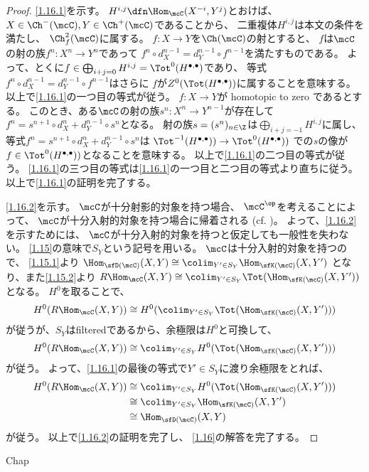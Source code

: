 \documentclass[uplatex,dvipdfmx]{jsarticle}
\begin{document}
\begin{proof}
  \ref{1.16.1}を示す。
  \(H^{i,j} \dfn \Hom_{\mcC}(X^{-i},Y^j)\)とおけば、
  \(X\in \Ch^-(\mcC), Y\in \Ch^+(\mcC)\)であることから、
  二重複体\(H^{i,j}\)は本文の条件\cite[(1.9.2)]{kashiwara2002sheaves}を満たし、
  \(\Ch^2_f(\mcC)\)に属する。
  \(f:X\to Y\)を\(\Ch(\mcC)\)の射とすると、
  \(f\)は\(\mcC\)の射の族\(f^n:X^n\to Y^n\)であって
  \(f^n\circ d_X^{n-1} = d_Y^{n-1}\circ f^{n-1}\)を満たすものである。
  よって、とくに\(f\in \bigoplus_{i+j = 0} H^{i,j} = \Tot^0(H^{\bullet,\bullet})\)であり、
  等式\(f^n\circ d_X^{n-1} = d_Y^{n-1}\circ f^{n-1}\)はさらに
  \(f\)が\(Z^0(\Tot(H^{\bullet,\bullet}))\)に属することを意味する。
  以上で\ref{1.16.1}の一つ目の等式が従う。
  \(f:X\to Y\)が homotopic to zero であるとする。
  このとき、ある\(\mcC\)の射の族\(s^n:X^n\to Y^{n-1}\)が存在して
  \(f^n = s^{n+1}\circ d_X^n + d_Y^{n-1} \circ s^n\)となる。
  射の族\(s=(s^n)_{n\in \Z}\)は\(\bigoplus_{i+j=-1}H^{i,j}\)に属し、
  等式\(f^n = s^{n+1}\circ d_X^n + d_Y^{n-1} \circ s^n\)は
  \(\Tot^{-1}(H^{\bullet,\bullet}))\to \Tot^0(H^{\bullet,\bullet}))\)
  での\(s\)の像が\(f\in \Tot^0(H^{\bullet,\bullet}))\)となることを意味する。
  以上で\ref{1.16.1}の二つ目の等式が従う。
  \ref{1.16.1}の三つ目の等式は\ref{1.16.1}の一つ目と二つ目の等式より直ちに従う。
  以上で\ref{1.16.1}の証明を完了する。

  \ref{1.16.2}を示す。
  \(\mcC\)が十分射影的対象を持つ場合、
  \(\mcC^{\op}\)を考えることによって、
  \(\mcC\)が十分入射的対象を持つ場合に帰着される
  (cf. \cite[Remark 1.10.10]{kashiwara2002sheaves})。
  よって、\ref{1.16.2}を示すためには、
  \(\mcC\)が十分入射的対象を持つと仮定しても一般性を失わない。
  \autoref{1.15}の意味で\(S_Y\)という記号を用いる。
  \(\mcC\)は十分入射的対象を持つので、
  \autoref{1.15.1}より
  \(\Hom_{\sfD(\mcC)}(X,Y) \cong \colim_{Y'\in S_Y}\Hom_{\sfK(\mcC)}(X,Y')\)
  となり、また\autoref{1.15.2}より
  \(R\Hom_{\mcC}(X,Y) \cong \colim_{Y'\in S_Y}\Tot(\Hom_{\sfK(\mcC)}(X,Y'))\)
  となる。
  \(H^0\)を取ることで、
  \[
  H^0(R\Hom_{\mcC}(X,Y))
  \cong H^0(\colim_{Y'\in S_Y}\Tot(\Hom_{\sfK(\mcC)}(X,Y')))
  \]
  が従うが、\(S_Y\)はfilteredであるから、余極限は\(H^0\)と可換して、
  \[
  H^0(R\Hom_{\mcC}(X,Y)) \cong
  \colim_{Y'\in S_Y}H^0(\Tot(\Hom_{\sfK(\mcC)}(X,Y')))
  \]
  が従う。
  よって、\ref{1.16.1}の最後の等式で\(Y'\in S_Y\)に渡り余極限をとれば、
  \begin{align*}
    H^0(R\Hom_{\mcC}(X,Y))
    &\cong \colim_{Y'\in S_Y}H^0(\Tot(\Hom_{\sfK(\mcC)}(X,Y'))) \\
    &\cong \colim_{Y'\in S_Y}\Hom_{\sfK(\mcC)}(X,Y') \\
    &\cong \Hom_{\sfD(\mcC)}(X,Y)
  \end{align*}
  が従う。
  以上で\ref{1.16.2}の証明を完了し、
  \autoref{1.16}の解答を完了する。
\end{proof}





\ifcsname Chap\endcsname\else
\printbibliography
\end{document}
